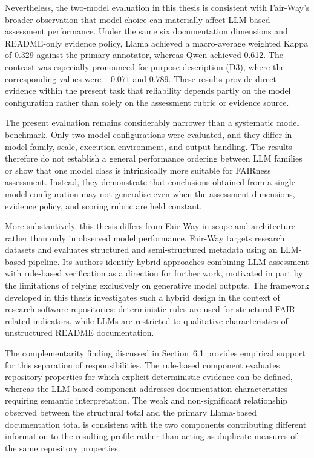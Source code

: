 Nevertheless, the two-model evaluation in this thesis is consistent
with Fair-Way's broader observation that model choice can materially
affect LLM-based assessment performance. Under the same six
documentation dimensions and README-only evidence policy, Llama
achieved a macro-average weighted Kappa of 0.329 against the primary
annotator, whereas Qwen achieved 0.612. The contrast was especially
pronounced for purpose description (D3), where the corresponding
values were $-0.071$ and 0.789. These results provide direct evidence
within the present task that reliability depends partly on the model
configuration rather than solely on the assessment rubric or evidence
source.

The present evaluation remains considerably narrower than a systematic
model benchmark. Only two model configurations were evaluated, and
they differ in model family, scale, execution environment, and output
handling. The results therefore do not establish a general performance
ordering between LLM families or show that one model class is
intrinsically more suitable for FAIRness assessment. Instead, they
demonstrate that conclusions obtained from a single model
configuration may not generalise even when the assessment dimensions,
evidence policy, and scoring rubric are held constant.

More substantively, this thesis differs from Fair-Way in scope and
architecture rather than only in observed model performance. Fair-Way
targets research datasets and evaluates structured and semi-structured
metadata using an LLM-based pipeline. Its authors identify hybrid
approaches combining LLM assessment with rule-based verification as
a direction for further work, motivated in part by the limitations
of relying exclusively on generative model outputs. The framework
developed in this thesis investigates such a hybrid design in the
context of research software repositories: deterministic rules are
used for structural FAIR-related indicators, while LLMs are restricted
to qualitative characteristics of unstructured README documentation.

The complementarity finding discussed in Section~6.1 provides
empirical support for this separation of responsibilities. The
rule-based component evaluates repository properties for which
explicit deterministic evidence can be defined, whereas the LLM-based
component addresses documentation characteristics requiring semantic
interpretation. The weak and non-significant relationship observed
between the structural total and the primary Llama-based documentation
total is consistent with the two components contributing different
information to the resulting profile rather than acting as duplicate
measures of the same repository properties.

